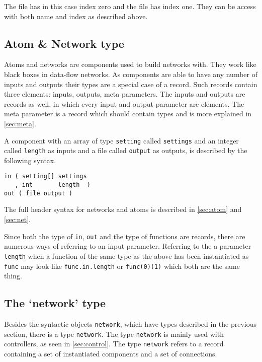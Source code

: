 The file has in this case index zero and the file has index one. They
can be access with both name and index as described above.


\subsection{Atom \& Network type}\label{sec:atomnet}
Atoms and networks are components used to build networks with. They
work like black boxes in data-flow networks. As components are able to
have any number of inputs and outputs their types are a special case
of a record. Such records contain three elements: inputs, outputs,
meta parameters. The inputs and outputs are records as well, in which
every input and output parameter are elements. The meta parameter is a
record which should contain types and is more explained in
\autoref{sec:meta}.

A component with an array of type \verb#setting# called
\verb#settings# and an integer called \verb#length# as inputs and a
file called \verb#output# as outputs, is described by the following
syntax.

\begin{verbatim}
in ( setting[] settings
   , int       length  )
out ( file output )
\end{verbatim}

The full header syntax for networks and atoms is described in
\autoref{sec:atom} and \autoref{sec:net}.

Since both the type of \verb#in#, \verb#out# and the type of functions
are records, there are numerous ways of referring to an input
parameter. Referring to the a parameter \verb#length# when a function
of the same type as the above has been instantiated as \verb#func# may
look like \verb#func.in.length# or \verb#func(0)(1)# which both are
the same thing.


\subsection{The `network' type}
Besides the syntactic objects \verb#network#, which have types
described in the previous section, there is a type \verb#network#. The
type \verb#network# is mainly used with controllers, as seen in
\autoref{sec:control}. The type \verb#network# refers to a record
containing a set of instantiated components and a set of connections.



